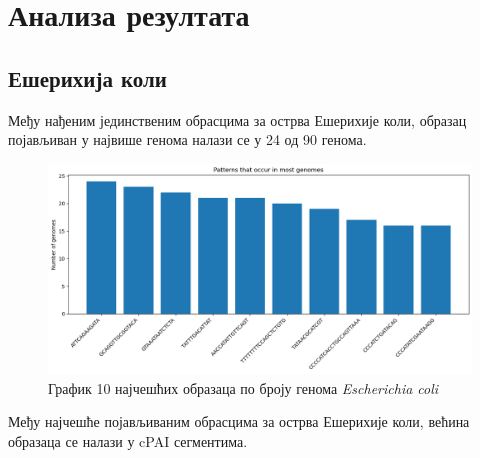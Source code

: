 \documentclass[12pt]{article}
\begin{document}
\newpage

\section{Анализа резултата}
\subsection{Ешерихија коли}

Међу нађеним јединственим обрасцима за острва Ешерихије коли, образац појављиван у највише генома налази се у 24 од 90 генома.

\begin{figure}[htbp]
    \centering
    \vspace{0.2cm}
    \includegraphics[width=\linewidth]{images/e_coli/top_10_hist.png}
    \caption{График 10 најчешћих образаца по броју генома \textit{Escherichia coli}}
    \vspace{0.5cm}
    \label{fig:top10hist}
\end{figure}

Међу најчешће појављиваним обрасцима за острва Ешерихије коли, већина образаца се налази у cPAI сегментима.
\end{document}
